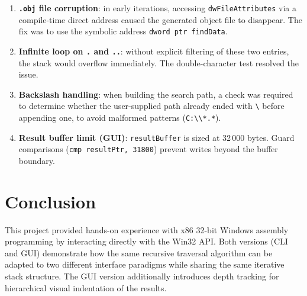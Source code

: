 \documentclass[12pt,a4paper]{article}
\begin{document}
\begin{enumerate}
  \item \textbf{\texttt{.obj} file corruption}: in early iterations, accessing \texttt{dwFileAttributes} via a compile-time direct address caused the generated object file to disappear. The fix was to use the symbolic address \texttt{dword ptr findData}.

  \item \textbf{Infinite loop on \texttt{.} and \texttt{..}}: without explicit filtering of these two entries, the stack would overflow immediately. The double-character test resolved the issue.

  \item \textbf{Backslash handling}: when building the search path, a check was required to determine whether the user-supplied path already ended with \texttt{\textbackslash} before appending one, to avoid malformed patterns (\texttt{C:\textbackslash{}\textbackslash{}*.*}).

  \item \textbf{Result buffer limit (GUI)}: \texttt{resultBuffer} is sized at 32\,000 bytes. Guard comparisons (\texttt{cmp resultPtr, 31800}) prevent writes beyond the buffer boundary.
\end{enumerate}

\section{Conclusion}

This project provided hands-on experience with x86 32-bit Windows assembly programming by interacting directly with the Win32 API. Both versions (CLI and GUI) demonstrate how the same recursive traversal algorithm can be adapted to two different interface paradigms while sharing the same iterative stack structure. The GUI version additionally introduces depth tracking for hierarchical visual indentation of the results.
\end{document}
